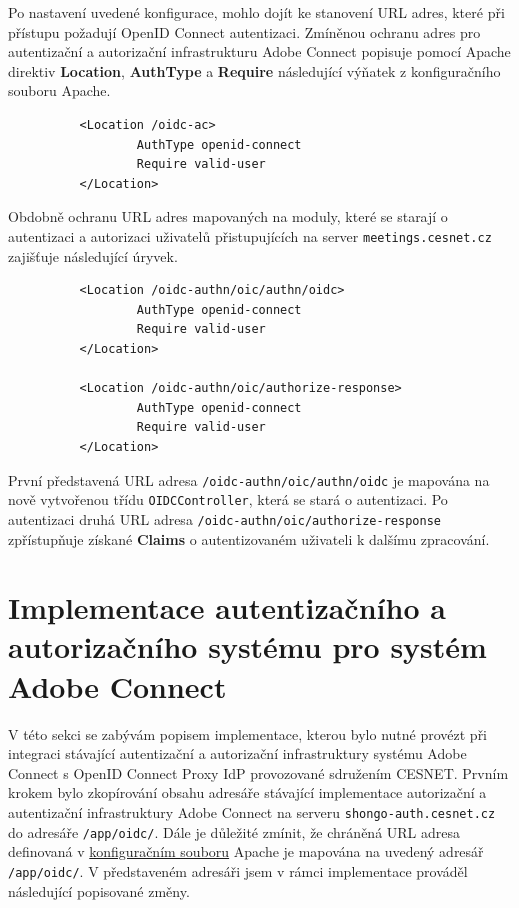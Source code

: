 \documentclass[
  printed, %
  twoside, %
  table,   %
  nolof,     %
  nolot,     %
]{fithesis3}
\begin{document}
Po nastavení uvedené konfigurace, mohlo dojít ke stanovení URL adres, které při přístupu požadují OpenID Connect autentizaci. Zmíněnou ochranu adres pro autentizační a autorizační infrastrukturu Adobe Connect popisuje pomocí Apache direktiv \textbf{Location}, \textbf{AuthType} a \textbf{Require} následující výňatek z konfiguračního souboru Apache.

\begin{lstlisting}
          <Location /oidc-ac>
                  AuthType openid-connect
                  Require valid-user
          </Location>
\end{lstlisting}
\label{ac-location}

Obdobně ochranu URL adres mapovaných na moduly, které se starají o autentizaci a autorizaci uživatelů přistupujících na server \texttt{meetings.cesnet.cz} zajišťuje následující úryvek. 

\begin{lstlisting}
          <Location /oidc-authn/oic/authn/oidc>
                  AuthType openid-connect
                  Require valid-user
          </Location>
          
          <Location /oidc-authn/oic/authorize-response>
                  AuthType openid-connect
                  Require valid-user
          </Location>
\end{lstlisting}
První představená URL adresa \texttt{/oidc-authn/oic/authn/oidc} je mapována na nově vytvořenou třídu \texttt{OIDCController}, která se stará o autentizaci. Po autentizaci druhá URL adresa \texttt{/oidc-authn/oic/authorize-response} zpřístupňuje získané \textbf{Claims} o autentizovaném uživateli k dalšímu zpracování.  

\label{shongo-location}

\section{Implementace autentizačního a autorizačního systému pro systém Adobe Connect}
\label{ACImpl}
V této sekci se zabývám popisem implementace, kterou bylo nutné provézt při integraci stávající autentizační a autorizační infrastruktury systému Adobe Connect s OpenID Connect Proxy IdP provozované sdružením CESNET. Prvním krokem bylo zkopírování obsahu adresáře stávající implementace autorizační a autentizační infrastruktury Adobe Connect na serveru \texttt{shongo-auth.cesnet.cz} do adresáře \texttt{/app/oidc/}. Dále je důležité zmínit, že chráněná URL adresa definovaná v \hyperref[ac-location]{konfiguračním souboru} Apache je mapována na uvedený adresář \texttt{/app/oidc/}. V představeném adresáři jsem v rámci implementace prováděl následující popisované změny. \par
\end{document}
